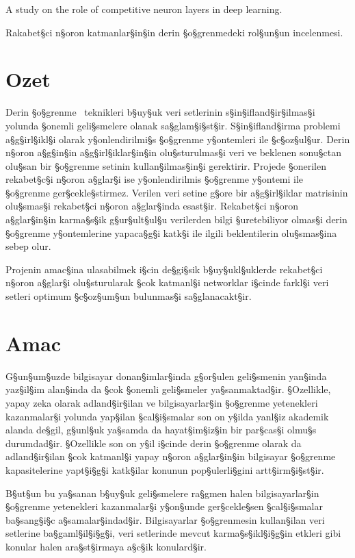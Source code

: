 


A study on the role of competitive neuron layers in deep learning.

Rakabet§ci n§oron katmanlar§in§in derin §o§grenmedeki rol§un§un incelenmesi. 

 
\section*{Ozet}

Derin §o§grenme~\cite{LeCun:2015} teknikleri b§uy§uk veri setlerinin
s§in§ifland§ir§ilmas§i yolunda §onemli geli§smelere olanak sa§glam§i§st§ir.
S§in§ifland§irma problemi a§g§irl§ikl§i olarak y§onlendirilmi§s §o§grenme
y§ontemleri ile §c§oz§ul§ur. Derin n§oron a§g§in§in a§g§irl§iklar§in§in
olu§sturulmas§i veri ve beklenen sonu§ctan olu§san bir §o§grenme setinin
kullan§ilmas§in§i gerektirir. Projede §onerilen rekabet§c§i n§oron a§glar§i ise
y§onlendirilmis §o§grenme y§ontemi ile §o§grenme ger§cekle§stirmez. Verilen
veri setine g§ore bir a§g§irl§iklar matrisinin olu§smas§i rekabet§ci n§oron
a§glar§inda esast§ir. Rekabet§ci n§oron a§glar§in§in karma§s§ik g§ur§ult§ul§u
verilerden bilgi §uretebiliyor olmas§i derin §o§grenme y§ontemlerine
yapaca§g§i katk§i ile ilgili beklentilerin olu§smas§ina sebep olur.

Projenin amac§ina ulasabilmek i§cin de§gi§sik b§uy§ukl§uklerde rekabet§ci n§oron
a§glar§i olu§sturularak §cok katmanl§i networklar i§cinde farkl§i veri
setleri optimum §c§oz§um§un bulunmas§i sa§glanacakt§ir.


\section*{Amac}

G§un§um§uzde bilgisayar donan§imlar§inda g§or§ulen geli§smenin yan§inda yaz§il§im
alan§inda da §cok §onemli geli§smeler ya§sanmaktad§ir. §Ozellikle, yapay zeka
olarak adland§ir§ilan ve bilgisayarlar§in §o§grenme yetenekleri
kazanmalar§i yolunda yap§ilan §cal§i§smalar son on y§ilda yanl§iz akademik
alanda de§gil, g§unl§uk ya§samda da hayat§im§iz§in bir par§cas§i olmu§s
durumdad§ir.  §Ozellikle son on y§il i§cinde derin
§o§grenme olarak da adland§ir§ilan §cok katmanl§i yapay n§oron a§glar§in§in
bilgisayar §o§grenme kapasitelerine yapt§i§g§i katk§ilar konunun
pop§ulerli§gini artt§irm§i§st§ir.

B§ut§un bu ya§sanan b§uy§uk geli§smelere ra§gmen halen bilgisayarlar§in
§o§grenme yetenekleri kazanmalar§i y§on§unde ger§cekle§sen §cal§i§smalar
ba§sang§i§c a§samalar§indad§ir. Bilgisayarlar §o§grenmesin kullan§ilan veri
setlerine ba§gaml§il§i§g§i, veri setlerinde mevcut karma§s§ikl§i§g§in etkleri
gibi konular halen ara§st§irmaya a§c§ik konulard§ir.
  

